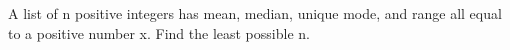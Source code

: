 A list of n positive integers has mean, median, unique mode, and range all equal to a positive number x. Find the least possible n.
